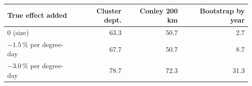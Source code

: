 \begin{tabular}{lrrr}
\toprule
True effect added & Cluster dept. & Conley 200 km & Bootstrap by year \\
\midrule
0 (size) & 63.3 & 50.7 & 2.7 \\
$-1.5\,\%$ per degree-day & 67.7 & 50.7 & 8.7 \\
$-3.0\,\%$ per degree-day & 78.7 & 72.3 & 31.3 \\
\bottomrule
\end{tabular}
